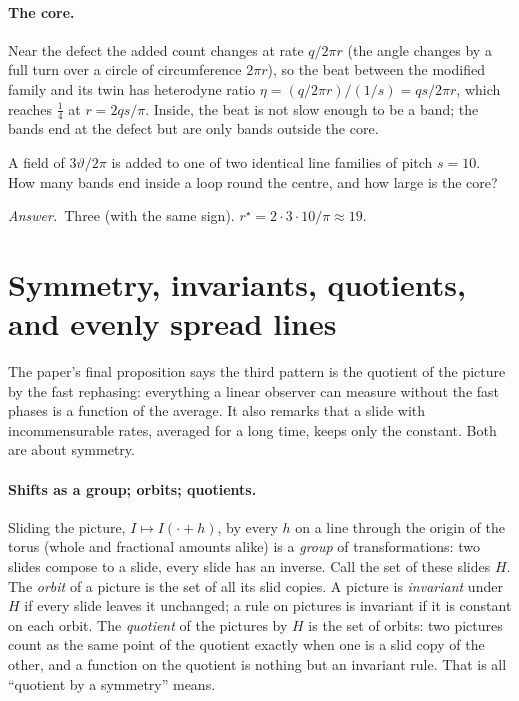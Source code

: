\documentclass[10pt]{article}
\theoremstyle{plain}
\theoremstyle{definition}
\newcommand{\answer}{\par\smallskip\noindent\textit{Answer.}\ }
\newcommand{\het}{\eta}
\begin{document}
\paragraph{The core.}
Near the defect the added count changes at rate $q/2\pi r$ (the angle
changes by a full turn over a circle of circumference $2\pi r$), so the
beat between the modified family and its twin has heterodyne ratio
$\het=(q/2\pi r)/(1/s)=qs/2\pi r$, which reaches $\tfrac14$ at $r=2qs/\pi$.
Inside, the beat is not slow enough to be a band; the bands end at the
defect but are only bands outside the core.

\begin{checkyourself}
A field of $3\vartheta/2\pi$ is added to one of two identical line families
of pitch $s=10$. How many bands end inside a loop round the centre, and how
large is the core?
\answer Three (with the same sign). $r^\star=2\cdot3\cdot10/\pi\approx19$.
\end{checkyourself}

\section{Symmetry, invariants, quotients, and evenly spread lines}
\label{p:symmetry}

\begin{why}
The paper's final proposition says the third pattern is the quotient of the
picture by the fast rephasing: everything a linear observer can measure
without the fast phases is a function of the average. It also remarks that
a slide with incommensurable rates, averaged for a long time, keeps only
the constant. Both are about symmetry.
\end{why}

\paragraph{Shifts as a group; orbits; quotients.}
Sliding the picture, $I\mapsto I(\cdot+h)$, by every $h$ on a line through
the origin of the torus (whole and fractional amounts alike) is a
\emph{group} of transformations: two slides compose to a slide, every slide
has an inverse. Call the set of these slides $H$. The \emph{orbit} of a
picture is the set of all its slid copies. A picture is \emph{invariant}
under $H$ if every slide leaves it unchanged; a rule on pictures is
invariant if it is constant on each orbit. The \emph{quotient} of the
pictures by $H$ is the set of orbits: two pictures count as the same point
of the quotient exactly when one is a slid copy of the other, and a
function on the quotient is nothing but an invariant rule. That is all
``quotient by a symmetry'' means.
\end{document}
